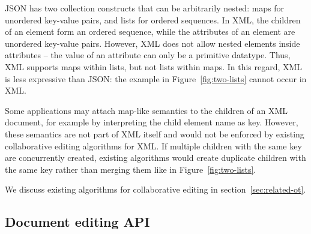 \documentclass[10pt,journal,compsoc]{IEEEtran}
\begin{document}
JSON has two collection constructs that can be arbitrarily nested: maps for unordered key-value pairs, and lists for ordered sequences. In XML, the children of an element form an ordered sequence, while the attributes of an element are unordered key-value pairs. However, XML does not allow nested elements inside attributes -- the value of an attribute can only be a primitive datatype. Thus, XML supports maps within lists, but not lists within maps. In this regard, XML is less expressive than JSON: the example in Figure~\ref{fig:two-lists} cannot occur in XML.

Some applications may attach map-like semantics to the children of an XML document, for example by interpreting the child element name as key. However, these semantics are not part of XML itself and would not be enforced by existing collaborative editing algorithms for XML. If multiple children with the same key are concurrently created, existing algorithms would create duplicate children with the same key rather than merging them like in Figure~\ref{fig:two-lists}.

We discuss existing algorithms for collaborative editing in section~\ref{sec:related-ot}.

\subsection{Document editing API}
\end{document}

